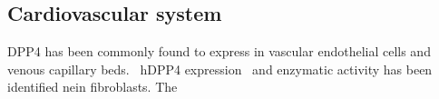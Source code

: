 \subsection{Cardiovascular system}
DPP4 has been commonly found to express in vascular endothelial cells and venous capillary beds.~\cite{Matheeussen2013,Shigeta2012}  hDPP4 expression~\cite{Nemoto1999} and enzymatic activity has been identified nein fibroblasts. The  